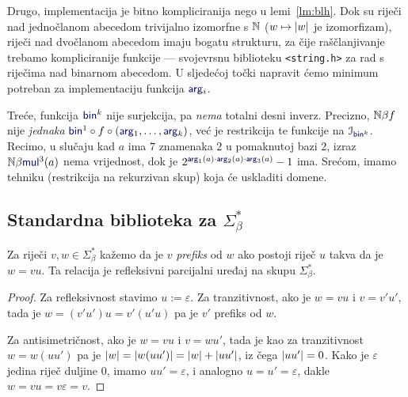 Drugo, implementacija je bitno kompliciranija nego u lemi~\ref{lm:blh}. Dok su riječi nad jednočlanom abecedom trivijalno izomorfne s ${\mathbb N}$ ($w\mapsto\lvert w\rvert$ je izomorfizam), riječi nad dvočlanom abecedom imaju bogatu strukturu, za čije raščlanjivanje trebamo kompliciranije funkcije --- svojevrsnu biblioteku \texttt{<string.h>} za rad s riječima nad binarnom abecedom. U sljedećoj točki napravit ćemo minimum potreban za implementaciju funkcija $\f{arg}_i$.

Treće, funkcija $\f{bin}^k$ nije surjekcija, pa \emph{nema} totalni desni inverz. Precizno, ${\mathbb N}\beta f$ nije \emph{jednaka} $\f{bin}^1\circ f\circ(\f{arg}_1,\dotsc,\f{arg}_k)$, već je restrikcija te funkcije na $\im{\f{bin}^k}$. %
Recimo, u slučaju kad $a$ ima $7$ znamenaka $2$ u pomaknutoj bazi $2$, izraz $\N\beta\f{mul}^3(a)$ nema vrijednost, dok je $2^{\f{arg}_1(a)\cdot\f{arg}_2(a)\cdot\f{arg}_3(a)}-1$ ima. Srećom, imamo tehniku (restrikcija na rekurzivan skup) koja će uskladiti domene.

\subsection{Standardna biblioteka za \texorpdfstring{$\Sigma_\beta^*$}{binarne stringove}}\label{sec:stdstring}

\begin{propozicija}[{name=["biti prefiks" je parcijalni uređaj]}]\label{pp:prefiksrpu}
Za riječi $v,w\in\Sigma_\beta^*$ kažemo da je $v$ \emph{prefiks} od $w$ ako postoji riječ $u$ takva da je $w=vu$.
Ta relacija je refleksivni parcijalni uređaj na skupu $\Sigma_\beta^*$.
\end{propozicija}
\begin{proof}
Za refleksivnost stavimo $u:=\varepsilon$. Za tranzitivnost, ako je $w=vu$ i $v=v'u'$, tada je $w=(v'u')u=v'(u'u)$ pa je $v'$ prefiks od $w$.

Za antisimetričnost, ako je $w=vu$ i $v=wu'$, tada je kao za tranzitivnost $w=w(uu')$ pa je $\lvert w\rvert=\lvert w(uu')\rvert=\lvert w\rvert+\lvert uu'\rvert$, iz čega $\lvert uu'\rvert=0$. Kako je $\varepsilon$ jedina riječ duljine $0$, imamo $uu'=\varepsilon$, i analogno $u=u'=\varepsilon$, dakle $w=vu=v\varepsilon=v$.
\end{proof}

